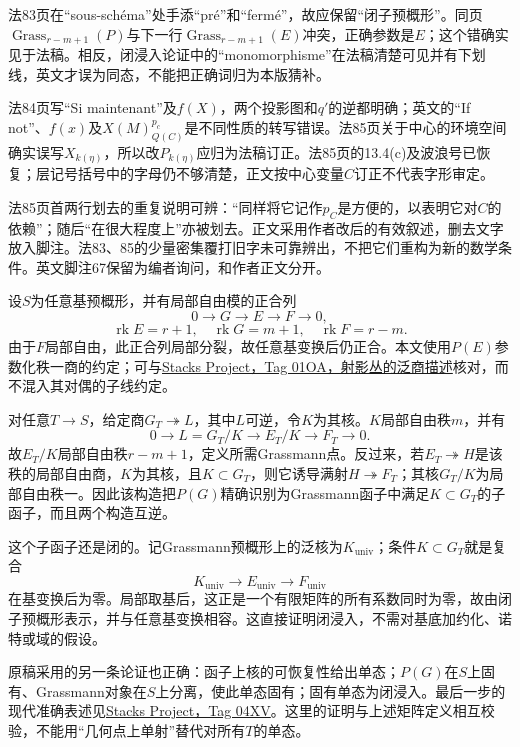法83页在“sous-schéma”处手添“pré”和“fermé”，故应保留“闭子预概形”。同页$\operatorname{Grass}_{r-m+1}(P)$与下一行$\operatorname{Grass}_{r-m+1}(E)$冲突，正确参数是$E$；这个错确实见于法稿。相反，闭浸入论证中的“monomorphisme”在法稿清楚可见并有下划线，英文才误为同态，不能把正确词归为本版猜补。

法84页写“Si maintenant”及$f(X)$，两个投影图和$q'$的逆都明确；英文的“If not”、$f(x)$及$X(M)^{p_c}_{Q(C)}$是不同性质的转写错误。法85页关于中心的环境空间确实误写$X_{k(\eta)}$，所以改$P_{k(\eta)}$应归为法稿订正。法85页的13.4(c)及波浪号已恢复；层记号括号中的字母仍不够清楚，正文按中心变量$C$订正不代表字形审定。

法85页首两行划去的重复说明可辨：“同样将它记作$p_C$是方便的，以表明它对$C$的依赖”；随后“在很大程度上”亦被划去。正文采用作者改后的有效叙述，删去文字放入脚注。法83、85的少量密集覆打旧字未可靠辨出，不把它们重构为新的数学条件。英文脚注67保留为编者询问，和作者正文分开。

设$S$为任意基预概形，并有局部自由模的正合列
\[
0\longrightarrow G\longrightarrow E\longrightarrow F\longrightarrow0,
\]
\[
\operatorname{rk}E=r+1,\quad
\operatorname{rk}G=m+1,\quad
\operatorname{rk}F=r-m.
\]
由于$F$局部自由，此正合列局部分裂，故任意基变换后仍正合。本文使用$P(E)$参数化秩一商的约定；可与\href{https://stacks.math.columbia.edu/tag/01OA}{Stacks Project，Tag 01OA，射影丛的泛商描述}核对，而不混入其对偶的子线约定。

对任意$T\to S$，给定商$G_T\twoheadrightarrow L$，其中$L$可逆，令$K$为其核。$K$局部自由秩$m$，并有
\[
0\longrightarrow L=G_T/K
 \longrightarrow E_T/K\longrightarrow F_T\longrightarrow0.
\]
故$E_T/K$局部自由秩$r-m+1$，定义所需Grassmann点。反过来，若$E_T\twoheadrightarrow H$是该秩的局部自由商，$K$为其核，且$K\subset G_T$，则它诱导满射$H\twoheadrightarrow F_T$；其核$G_T/K$为局部自由秩一。因此该构造把$P(G)$精确识别为Grassmann函子中满足$K\subset G_T$的子函子，而且两个构造互逆。

这个子函子还是闭的。记Grassmann预概形上的泛核为$K_{\mathrm{univ}}$；条件$K\subset G_T$就是复合
\[
K_{\mathrm{univ}}\longrightarrow E_{\mathrm{univ}}
 \longrightarrow F_{\mathrm{univ}}
\]
在基变换后为零。局部取基后，这正是一个有限矩阵的所有系数同时为零，故由闭子预概形表示，并与任意基变换相容。这直接证明闭浸入，不需对基底加约化、诺特或域的假设。

原稿采用的另一条论证也正确：函子上核的可恢复性给出单态；$P(G)$在$S$上固有、Grassmann对象在$S$上分离，使此单态固有；固有单态为闭浸入。最后一步的现代准确表述见\href{https://stacks.math.columbia.edu/tag/04XV}{Stacks Project，Tag 04XV}。这里的证明与上述矩阵定义相互校验，不能用“几何点上单射”替代对所有$T$的单态。


